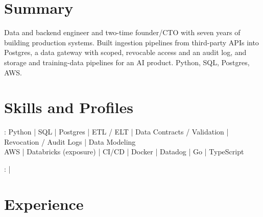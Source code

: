 \documentclass[print]{jack-resume}
\begin{document}
\pagecolor{darkmodeBackground}


\begin{minipage}[t][1cm][t]{.03\textwidth}
    \hfill
\end{minipage}

\section{Summary}
Data and backend engineer and two-time founder/CTO with seven years of building production systems. Built ingestion pipelines from third-party APIs into Postgres, a data gateway with scoped, revocable access and an audit log, and storage and training-data pipelines for an AI product. Python, SQL, Postgres, AWS.
\sectionsep

\section{Skills and Profiles}
:
Python \hfill | \hfill
SQL \hfill | \hfill
Postgres \hfill | \hfill
ETL / ELT \hfill | \hfill
Data Contracts / Validation \hfill | \hfill
Revocation / Audit Logs \hfill | \hfill
Data Modeling \\
\hspace{1.0cm} AWS \hfill | \hfill
Databricks (exposure) \hfill | \hfill
CI/CD \hfill | \hfill
Docker \hfill | \hfill
Datadog \hfill | \hfill
Go \hfill | \hfill
TypeScript \\

\raggedright{
    :
      \href{https://www.linkedin.com/in/jack-sturtevant/}{ \ExternalLink} |
     \href{https://github.com/jacksturt}{ \ExternalLink}}

\section{Experience}
\end{document}
